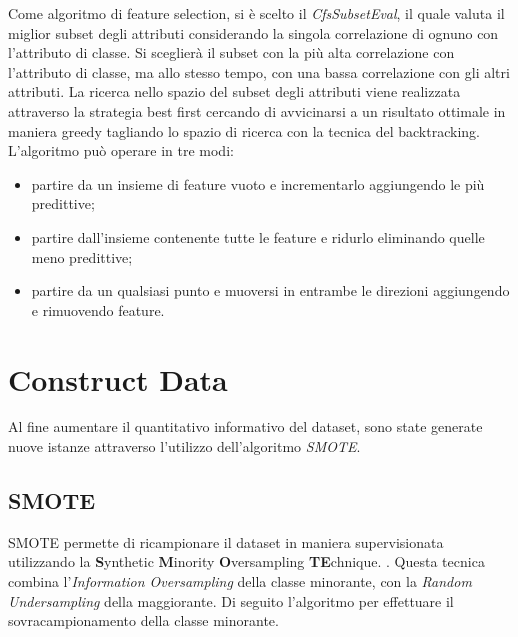 Come algoritmo di feature selection, si è scelto il \emph{CfsSubsetEval}, il quale valuta il miglior subset degli attributi considerando la singola correlazione di ognuno con l'attributo di classe. Si sceglierà il subset con la più alta correlazione con l'attributo di classe, ma allo stesso tempo, con una bassa correlazione con gli altri attributi. La ricerca nello spazio del subset degli attributi viene realizzata attraverso la strategia best first cercando di avvicinarsi a un risultato ottimale in maniera greedy tagliando lo spazio di ricerca con la tecnica del backtracking.\cite{Hall1998}
L'algoritmo può operare in tre modi:
\begin{itemize}
	\item partire da un insieme di feature vuoto e incrementarlo aggiungendo le più predittive;
	\item partire dall'insieme contenente tutte le feature e ridurlo eliminando quelle meno predittive;
	\item partire da un qualsiasi punto e muoversi in entrambe le direzioni aggiungendo e rimuovendo feature.
\end{itemize}
\section{Construct Data}
Al fine aumentare il quantitativo informativo del dataset, sono state generate nuove istanze attraverso l'utilizzo dell'algoritmo \textit{SMOTE}.
\subsection{SMOTE}
\label{SMOTE}
SMOTE permette di ricampionare il dataset in maniera supervisionata utilizzando la \textbf{S}ynthetic \textbf{M}inority \textbf{O}versampling \textbf{TE}chnique. 
\cite{Chawla02smote:synthetic}. Questa tecnica combina l'\emph{Information Oversampling} della classe minorante, con la \emph{Random Undersampling} della maggiorante. Di seguito l'algoritmo per effettuare il sovracampionamento della classe minorante.

